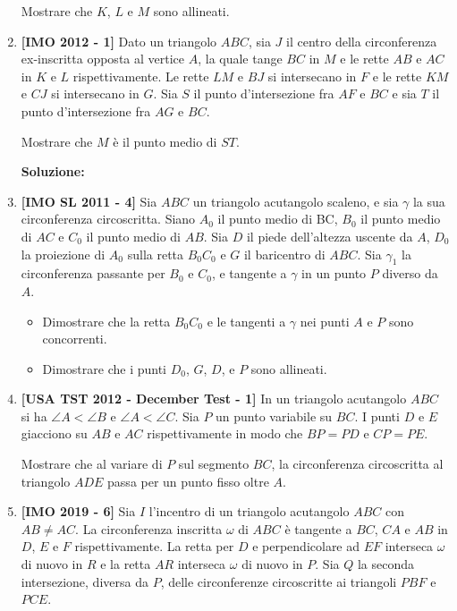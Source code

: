 \begin{enumerate}
	Mostrare che $K$, $L$ e $M$ sono allineati.
	
	\item \textbf{[IMO 2012 - 1]} Dato un triangolo $ABC$, sia $J$ il centro della circonferenza ex-inscritta opposta al vertice $A$, la quale tange $BC$ in $M$ e le rette $AB$ e $AC$ in $K$ e $L$ rispettivamente. Le rette $LM$ e $BJ$ si intersecano in $F$ e le rette $KM$ e $CJ$ si intersecano in $G$. Sia $S$ il punto d'intersezione fra $AF$ e $BC$ e sia $T$ il punto d'intersezione fra $AG$ e $BC$. 
	
	Mostrare che $M$ è il punto medio di $ST$.
	
	\textbf{Soluzione:}
	
	\item \textbf{[IMO SL 2011 - 4]} Sia $ABC$ un triangolo acutangolo scaleno, e sia $\gamma$ la sua circonferenza circoscritta.
	Siano $A_0$ il punto medio di BC, $B_0$ il punto medio di $AC$ e $C_0$ il punto medio di $AB$. Sia
	$D$ il piede dell’altezza uscente da $A$, $D_0$ la proiezione di $A_0$ sulla retta $B_0C_0$ e $G$ il
	baricentro di $ABC$. Sia $\gamma_1$ la circonferenza passante per $B_0$ e $C_0$, e tangente a $\gamma$ in un
	punto $P$ diverso da $A$.
	\begin{itemize}
	\item Dimostrare che la retta $B_0C_0$ e le tangenti a $\gamma$ nei punti $A$ e $P$ sono concorrenti.
	\item Dimostrare che i punti $D_0$, $G$, $D$, e $P$ sono allineati.
	\end{itemize}
	\item \textbf{[USA TST 2012 - December Test - 1]} In un triangolo acutangolo $ABC$ si ha $\angle A<\angle B$ e $\angle A<\angle C$. Sia $P$ un punto variabile su $BC$. I punti $D$ e $E$ giacciono su $AB$ e $AC$ rispettivamente in modo che $BP=PD$ e $CP=PE$.
	
	Mostrare che al variare di $P$ sul segmento $BC$, la circonferenza circoscritta al triangolo $ADE$ passa per un punto fisso oltre $A$.
	\item  \textbf{[IMO 2019 - 6]} 
	Sia $I$ l'incentro di un triangolo acutangolo $ABC$ con $AB\neq AC$. La circonferenza inscritta $\omega$ di $ABC$ è tangente a $BC$, $CA$ e $AB$ in $D$, $E$ e $F$ rispettivamente. La retta per $D$ e perpendicolare ad $EF$ interseca $\omega$ di nuovo in $R$ e la retta $AR$ interseca $\omega$ di nuovo in $P$. Sia $Q$ la seconda intersezione, diversa da $P$, delle circonferenze circoscritte ai triangoli $PBF$ e $PCE$.
	

\end{enumerate}
